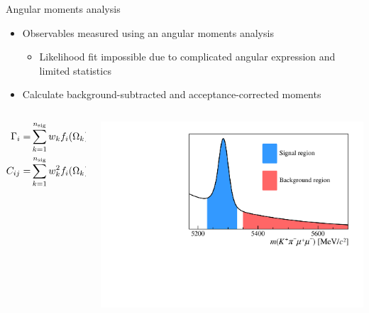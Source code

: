 \documentclass[aspectratio=1610]{beamer}
\begin{document}
\begin{frame}{Angular moments analysis}

\begin{itemize}
  \item Observables measured using an angular moments analysis
  \begin{itemize}
    \item[\ding{70}] Likelihood fit impossible due to complicated angular expression and limited statistics
  \end{itemize}
\end{itemize}

\begin{itemize}
\item Calculate background-subtracted and acceptance-corrected moments
\end{itemize}

\begin{columns}
\begin{column}{0.6\textwidth}
\begin{equation*}
  \begin{aligned}
  \Gamma_i =&  \sum_{k=1}^{n_{\rm sig}} w_{k}f_i(\Omega_k)  - x\sum_{k=1}^{n_{\rm bkg}} w_{k}f_i(\Omega_k)\\
  C_{ij} =& \sum_{k=1}^{n_{\rm sig}} w^{2}_{k}f_i(\Omega_k)f_j(\Omega_k)   + x^2\sum_{k=1}^{n_{\rm bkg}} w^{2}_{k}f_i(\Omega_k)f_j(\Omega_k)
  \end{aligned}
  \label{eqn:mom:sigbkgacc}
\end{equation*}
\end{column}
\begin{column}{0.4\textwidth}
\begin{centering}
\includegraphics[width=\textwidth]{figs/moments-regions.pdf}
\end{centering}
\end{column}
\end{columns}


\end{frame}
\end{document}
